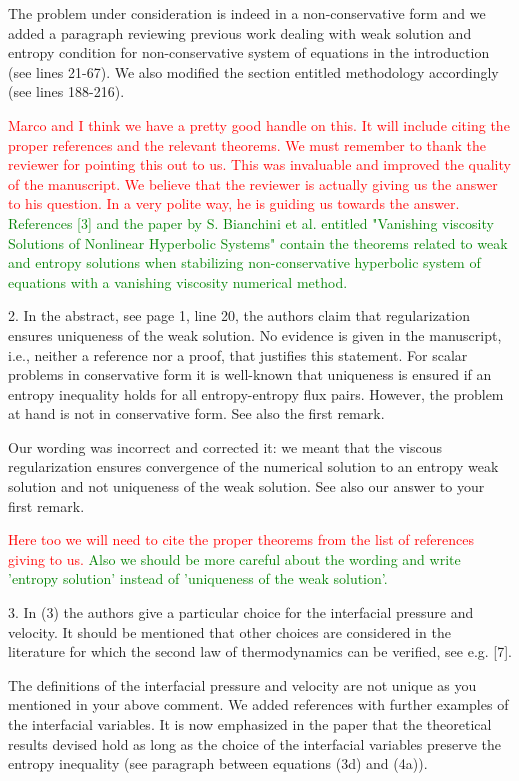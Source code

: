 \documentclass{article}
\newcommand{\tcr}[1]{\textcolor{red}{#1}}
\newcommand{\tcg}[1]{\textcolor{green}{#1}}
\begin{document}
The problem under consideration is indeed in a non-conservative form and we added a paragraph reviewing
previous work dealing with weak solution and entropy condition for non-conservative system of equations in the introduction (see lines 21-67). We also modified
the section entitled methodology accordingly (see lines 188-216).

\tcr{Marco and I think we have a pretty good handle on this. It will include
citing the proper references and the relevant theorems. We must remember to thank the reviewer
for pointing this out to us. This was invaluable and improved the quality of the manuscript.
We believe that the reviewer is actually giving us the answer to his question. In a very
polite way, he is guiding us towards the answer.}
\tcg{References [3] and the paper by S. Bianchini et al. entitled "Vanishing viscosity Solutions of Nonlinear Hyperbolic Systems" contain the theorems related to weak and entropy solutions when stabilizing non-conservative hyperbolic system of equations with a vanishing viscosity numerical method.}
\bigskip


{\color{blue}
2. In the abstract, see page 1, line 20, the authors claim that regularization ensures
uniqueness of the weak solution. No evidence is given in the manuscript, i.e., neither
a reference nor a proof, that justifies this statement. For scalar problems in 
conservative form it is well-known that uniqueness is ensured if an entropy inequality
holds for all entropy-entropy flux pairs. However, the problem at hand is not in
conservative form. See also the first remark.}

Our wording was incorrect and corrected it: we meant that the viscous regularization ensures convergence of the numerical solution to an entropy weak solution 
and not uniqueness of the weak solution. See also our answer to your first remark.

\tcr{Here too we will need to cite the proper theorems from the list of references giving to us.} \tcg{Also we should be more careful about the 
wording and write 'entropy solution' instead of 'uniqueness of the weak solution'.}
\bigskip


{\color{blue}
3. In (3) the authors give a particular choice for the interfacial pressure and velocity.
It should be mentioned that other choices are considered in the literature for which
the second law of thermodynamics can be verified, see e.g. [7].}

The definitions of the interfacial pressure and velocity are not unique as you mentioned in your above comment. We added references with further
examples of the interfacial variables. It is now emphasized in the paper that the theoretical results devised hold as long as the choice of the interfacial
variables preserve the entropy inequality (see paragraph between equations (3d) and (4a)). 
\end{document}
